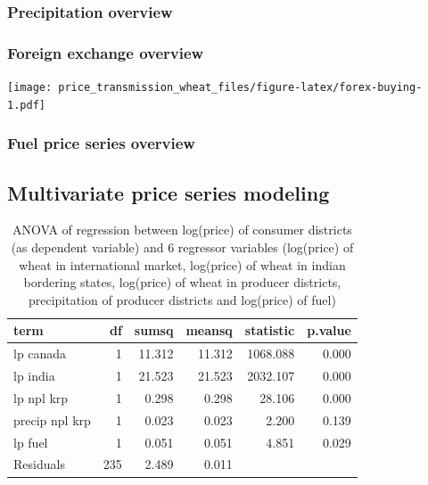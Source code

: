 \documentclass[12pt,]{article}
\begin{document}
\hypertarget{precipitation-overview}{%
\subsubsection{Precipitation overview}\label{precipitation-overview}}

\hypertarget{foreign-exchange-overview}{%
\subsubsection{Foreign exchange overview}\label{foreign-exchange-overview}}

\texttt{[image: price\_transmission\_wheat\_files/figure-latex/forex-buying-1.pdf]}

\hypertarget{fuel-price-series-overview}{%
\subsubsection{Fuel price series overview}\label{fuel-price-series-overview}}

\hypertarget{multivariate-price-series-modeling}{%
\subsection{Multivariate price series modeling}\label{multivariate-price-series-modeling}}

\begin{table}[H]

\caption{\label{tab:lm1-without-time-consumer}ANOVA of regression between log(price) of consumer districts (as dependent variable) and 6 regressor variables (log(price) of wheat in international market, log(price) of wheat in indian bordering states, log(price) of wheat in producer districts, precipitation of producer districts and log(price) of fuel)}
\centering
\begin{tabular}[t]{>{\raggedright\arraybackslash}p{7em}rrrrr}
\toprule
term & df & sumsq & meansq & statistic & p.value\\
\midrule
lp canada & 1 & 11.312 & 11.312 & 1068.088 & 0.000\\
lp india & 1 & 21.523 & 21.523 & 2032.107 & 0.000\\
lp npl krp & 1 & 0.298 & 0.298 & 28.106 & 0.000\\
precip npl krp & 1 & 0.023 & 0.023 & 2.200 & 0.139\\
lp fuel & 1 & 0.051 & 0.051 & 4.851 & 0.029\\
\addlinespace
Residuals & 235 & 2.489 & 0.011 &  & \\
\bottomrule
\end{tabular}
\end{table}
\end{document}
